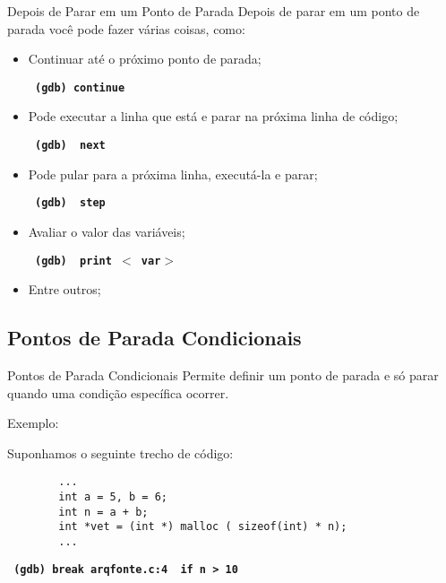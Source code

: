 \begin{frame}{Depois de Parar em um Ponto de Parada}
    Depois de parar em um ponto de parada você pode fazer várias coisas, como:
    \begin{itemize}
        \item Continuar até o próximo ponto de parada;
        \begin{center}
            \small
            \texttt{ \textbf{ (gdb) {\color{blue}continue} } }
        \end{center}
        \item Pode executar a linha que está e parar na próxima linha de código;
        \begin{center}
            \small
            \texttt{ \textbf{ (gdb) {\color{blue} next} } }
        \end{center}
        \item Pode pular para a próxima linha, executá-la e parar;
        \begin{center}
            \small
            \texttt{ \textbf{ (gdb) {\color{blue} step} } }
        \end{center}
        \item Avaliar o valor das variáveis;
        \begin{center}
            \small
            \texttt{ \textbf{ (gdb) {\color{blue} print} $<${\color{red} var}$>$ } }
        \end{center}
        \item Entre outros;
    \end{itemize}
    
\end{frame}

\subsection{ Pontos de Parada Condicionais }
\frame{\tableofcontents[
    currentsection,
    currentsubsection,
    subsectionstyle=show/shaded/hide
]}
\begin{frame}[fragile]{Pontos de Parada Condicionais}
    Permite definir um ponto de parada e só parar quando uma condição específica ocorrer.
    
    Exemplo:
    
    Suponhamos o seguinte trecho de código:
    
    \begin{lstlisting}
        ...
        int a = 5, b = 6;
        int n = a + b;
        int *vet = (int *) malloc ( sizeof(int) * n);
        ...
    \end{lstlisting}
    
    \begin{center}
        \small
        \texttt{ \textbf{ (gdb) {\color{blue}break}  {\color{black}arqfonte}{\color{red}.c}:{\color{dartmouthgreen}4} {\color{red} if n > 10 }}}
    \end{center}
\end{frame}

